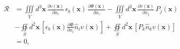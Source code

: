 \documentclass[22pt]{article} %
\begin{document}
%
\begin{align}\label{eq:poisson_problem_5}
\mathscr{R} &= \iiint\limits_V d^3 \textbf{x} \, \frac{\partial v(\textbf{x})}{\partial x_i} \, \epsilon_b(\textbf{x}) \, \frac{\partial \Phi(\textbf{x})}{\partial x_i} - \iiint\limits_V d^3 \textbf{x} \, \frac{\partial v(\textbf{x})}{\partial x_j}\, P_j(\textbf{x}) \\ \nonumber
&- \oiint\limits_S d^2 \textbf{x} \, \left[\epsilon_b(\textbf{x}) \frac{\partial \Phi}{\partial x_i} \hat{n}_i v(\textbf{x})\right] + \oiint\limits_S d^2 \textbf{x} \, \left[ P_k \hat{n}_k v(\textbf{x})\right] \\ \nonumber
&= 0,
\end{align}

%
%
%
%
\end{document}
